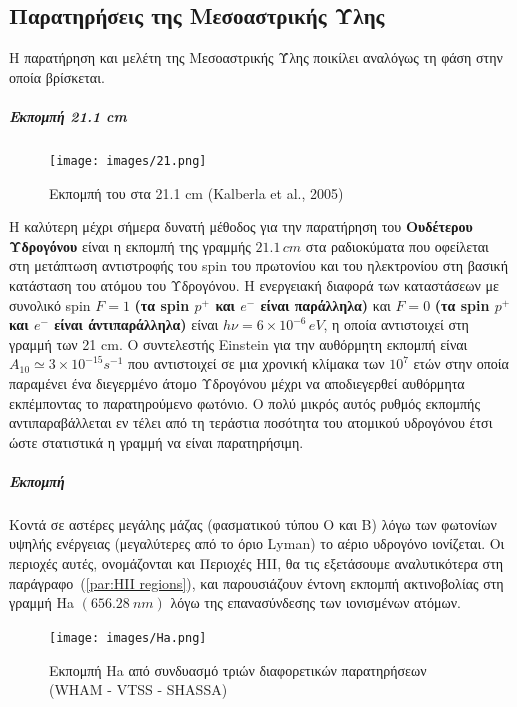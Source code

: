 \documentclass[a4paper,12pt]{memoir}
\begin{document}
\subsection{Παρατηρήσεις της Μεσοαστρικής Ύλης}
Η παρατήρηση και μελέτη της Μεσοαστρικής Ύλης ποικίλει αναλόγως τη φάση στην οποία βρίσκεται.
\subparagraph{Εκπομπή 21.1 cm}
\begin{figure}[h]
	\label{fig:21}
	\centering
	\texttt{[image: images/21.png]}
	\caption{Εκπομπή του  στα 21.1 cm (Kalberla et al., 2005)\cite{kalberla_2005}}
\end{figure}

H καλύτερη μέχρι σήμερα δυνατή μέθοδος για την παρατήρηση του \textbf{Ουδέτερου Υδρογόνου } είναι η εκπομπή της γραμμής $21.1 \, cm$ στα ραδιοκύματα που οφείλεται στη μετάπτωση αντιστροφής του spin του πρωτονίου και του ηλεκτρονίου στη βασική κατάσταση του ατόμου του Υδρογόνου. Η ενεργειακή διαφορά των καταστάσεων με συνολικό spin $F=1$ \textbf{(τα spin $p^+$ και $e^-$ είναι παράλληλα)} και $F=0$ \textbf{(τα spin $p^+$ και $e^-$ είναι άντιπαράλληλα)} είναι $h \nu=6\times 10^{-6} \, eV$, η οποία αντιστοιχεί στη γραμμή των 21 cm.
Ο συντελεστής Einstein για την αυθόρμητη εκπομπή είναι $A_{10} \simeq 3\times 10^{-15}s^{-1}$ που αντιστοιχεί σε μια χρονική κλίμακα των $10^7$ ετών στην οποία παραμένει ένα διεγερμένο άτομο Υδρογόνου μέχρι να αποδιεγερθεί αυθόρμητα εκπέμποντας το παρατηρούμενο φωτόνιο. Ο πολύ μικρός αυτός ρυθμός εκπομπής αντιπαραβάλλεται εν τέλει από τη τεράστια ποσότητα του ατομικού υδρογόνου έτσι ώστε στατιστικά η γραμμή να είναι παρατηρήσιμη.

\subparagraph{Εκπομπή }
Κοντά σε αστέρες μεγάλης μάζας (φασματικού τύπου O και B) λόγω των φωτονίων υψηλής ενέργειας (μεγαλύτερες από το όριο Lyman) το αέριο υδρογόνο ιονίζεται. Οι περιοχές αυτές, ονομάζονται και Περιοχές HII, θα τις εξετάσουμε αναλυτικότερα στη παράγραφο~(\ref{par:HII regions}), και παρουσιάζουν έντονη εκπομπή ακτινοβολίας στη γραμμή Ha $(656.28\ nm)$ λόγω της επανασύνδεσης των ιονισμένων ατόμων.

\begin{figure}[h]
	\label{fig:Ha}
	\centering
	\texttt{[image: images/Ha.png]}
	\caption{Εκπομπή Ha από συνδυασμό τριών διαφορετικών παρατηρήσεων (WHAM - VTSS - SHASSA) \cite{finkbeiner_2003}}
\end{figure}
\end{document}
